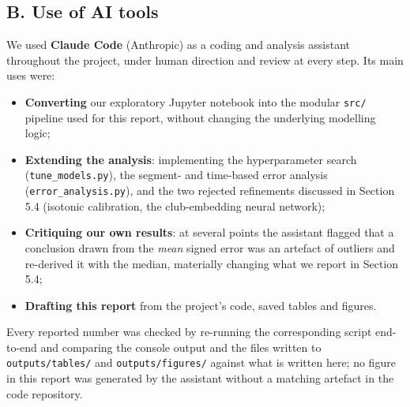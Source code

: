 \documentclass[11pt]{article}
\begin{document}
\subsection*{B. Use of AI tools}
We used \textbf{Claude Code} (Anthropic) as a coding and analysis assistant
throughout the project, under human direction and review at every step. Its
main uses were:
\begin{itemize}[leftmargin=1.4em]
    \item \textbf{Converting} our exploratory Jupyter notebook into the
    modular \texttt{src/} pipeline used for this report, without changing
    the underlying modelling logic;
    \item \textbf{Extending the analysis}: implementing the hyperparameter
    search (\texttt{tune\_models.py}), the segment- and time-based error
    analysis (\texttt{error\_analysis.py}), and the two rejected refinements
    discussed in Section 5.4 (isotonic calibration, the club-embedding
    neural network);
    \item \textbf{Critiquing our own results}: at several points the
    assistant flagged that a conclusion drawn from the \emph{mean} signed
    error was an artefact of outliers and re-derived it with the median,
    materially changing what we report in Section 5.4;
    \item \textbf{Drafting this report} from the project's code, saved
    tables and figures.
\end{itemize}
Every reported number was checked by re-running the corresponding script
end-to-end and comparing the console output and the files written to
\texttt{outputs/tables/} and \texttt{outputs/figures/} against what is
written here; no figure in this report was generated by the assistant
without a matching artefact in the code repository.
\end{document}

